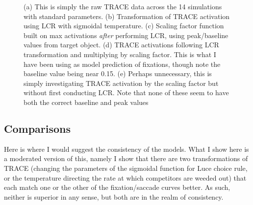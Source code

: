 \documentclass{article}
\begin{document}
\begin{figure}[H]
    \begin{singlespace}
    \caption{(a) This is simply the raw TRACE data across the 14 simulations with standard parameters. (b) Transformation of TRACE activation using LCR with sigmoidal temperature. (c) Scaling factor function built on max activations \textit{after} performing LCR, using peak/baseline values from target object. (d) TRACE activations following LCR transformation and multiplying by scaling factor. This is what I have been using as model prediction of fixations, though note the baseline value being near 0.15. (e) Perhaps unnecessary, this is simply investigating TRACE activation by the scaling factor but without first conducting LCR. Note that none of these seem to have both the correct baseline and peak values} \end{singlespace}
\label{fig:shades_of_trace}
\end{figure}


\subsection{Comparisons}

Here is where I would suggest the consistency of the models. What I show here is a moderated version of this, namely I show that there are two transformations of TRACE (changing the parameters of the sigmoidal function for Luce choice rule, or the temperature directing the rate at which competitors are weeded out) that each match one or the other of the fixation/saccade curves better. As such, neither is superior in any sense, but both are in the realm of consistency.
\end{document}
